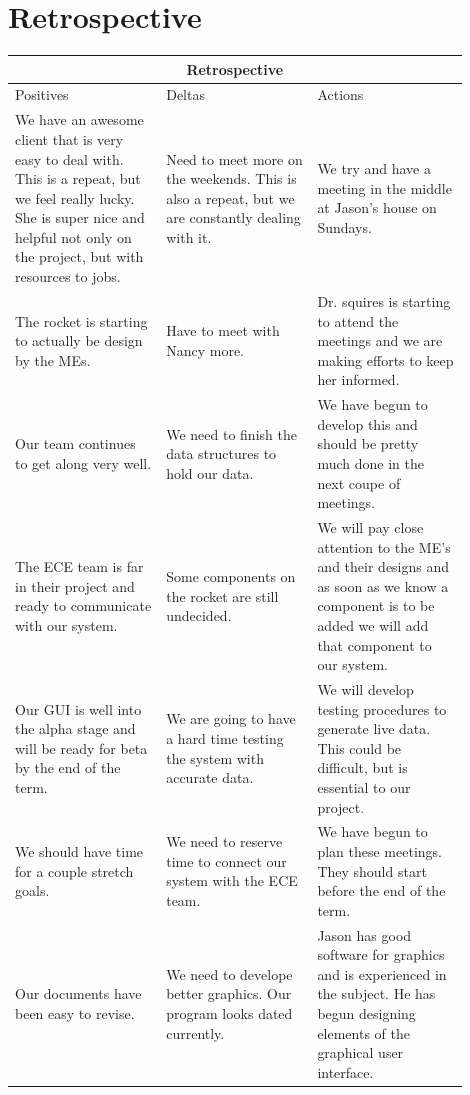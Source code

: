 \documentclass[10pt,draftclsnofoot,onecolumn]{IEEEtran}
\begin{document}
\section{Retrospective}
\begin{tabular}{ |p{0.3\linewidth}|p{0.3\linewidth}|p{0.3\linewidth}| }
\hline
\multicolumn{3}{|c|}{Retrospective} \\
\hline
    Positives & Deltas & Actions \\
\hline
    We have an awesome client that is very easy to deal with. This is a repeat, but we feel really lucky. She is super nice and helpful not only on the project, but with resources to jobs. & Need to meet more on the weekends. This is also a repeat, but we are constantly dealing with it. & We try and have a meeting in the middle at Jason's house on Sundays. \\
\hline
    The rocket is starting to actually be design by the MEs. & Have to meet with Nancy more.& Dr. squires is starting to attend the meetings and we are making efforts to keep her informed. \\
\hline
Our team continues to get along very well. & We need to finish the data structures to hold our data. & We have begun to develop this and should be pretty much done in the next coupe of meetings. \\
\hline
The ECE team is far in their project and ready to communicate with our system. & Some components on the rocket are still undecided. & We will pay close attention to the ME's and their designs and as soon as we know a component is to be added we will add that component to our system.\\
\hline
Our GUI is well into the alpha stage and will be ready for beta by the end of the term. & We are going to have a hard time testing the system with accurate data. & We will develop testing procedures to generate live data. This could be difficult, but is essential to our project. \\
\hline
We should have time for a couple stretch goals. & We need to reserve time to connect our system with the ECE team. & We have begun to plan these meetings. They should start before the end of the term. \\
\hline
Our documents have been easy to revise. & We need to develope better graphics. Our program looks dated currently. & Jason has good software for graphics and is experienced in the subject. He has begun designing elements of the graphical user interface. \\
\hline

\end{tabular}
\end{document}
